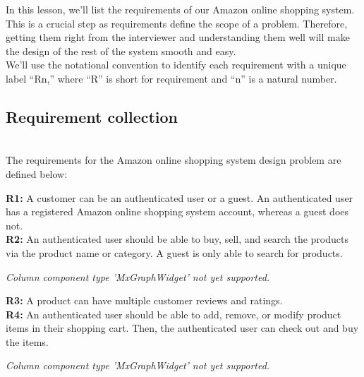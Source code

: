 

In this lesson, we'll list the requirements of our Amazon online shopping system. This is a crucial step as requirements define the scope of a problem. Therefore, getting them right from the interviewer and understanding them well will make the design of the rest of the system smooth and easy.
\\
We'll use the notational convention to identify each requirement with a unique label ``Rn,'' where ``R'' is short for requirement and ``n'' is a natural number.

\subsection{Requirement collection}\label{KD5eFiZtKI-LoGrqWP9Gp}
\\
The requirements for the Amazon online shopping system design problem are defined below:

\noindent
\begin{minipage}[t]{0.48\textwidth}\vspace{0pt}
\textbf{R1:} A customer can be an authenticated user or a guest. An authenticated user has a registered Amazon online shopping system account, whereas a guest does not.
\\
\textbf{R2:} An authenticated user should be able to buy, sell, and search the products via the product name or category. A guest is only able to search for products.
\end{minipage}
\hfill
\begin{minipage}[t]{0.48\textwidth}\vspace{0pt}
\textit{Column component type 'MxGraphWidget' not yet supported.}
\end{minipage}

\noindent
\begin{minipage}[t]{0.48\textwidth}\vspace{0pt}
\textbf{R3:} A product can have multiple customer reviews and ratings.
\\
\textbf{R4:} An authenticated user should be able to add, remove, or modify product items in their shopping cart. Then, the authenticated user can check out and buy the items.
\end{minipage}
\hfill
\begin{minipage}[t]{0.48\textwidth}\vspace{0pt}
\textit{Column component type 'MxGraphWidget' not yet supported.}
\end{minipage}

